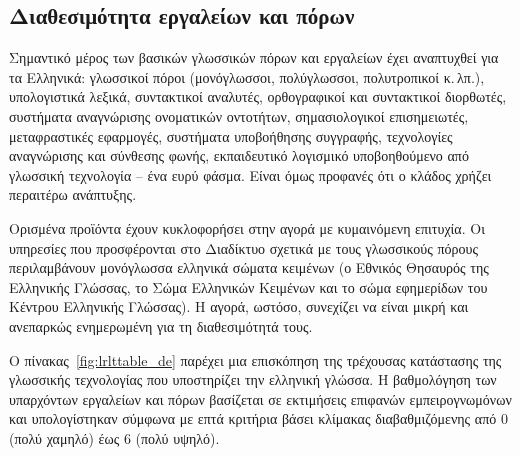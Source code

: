 \begin{multicols}{2}
\subsection{Διαθεσιμότητα εργαλείων και πόρων}

Σημαντικό μέρος των βασικών  γλωσσικών πόρων και εργαλείων έχει αναπτυχθεί για τα Ελληνικά: γλωσσικοί πόροι (μονόγλωσσοι, πολύγλωσσοι, πολυτροπικοί κ.\,λπ.), υπολογιστικά λεξικά, συντακτικοί αναλυτές, ορθογραφικοί και συντακτικοί διορθωτές, συστήματα αναγνώρισης ονοματικών οντοτήτων, σημασιολογικοί επισημειωτές, μεταφραστικές εφαρμογές, συστήματα υποβοήθησης συγγραφής, τεχνολογίες αναγνώρισης και σύνθεσης φωνής, εκπαιδευτικό λογισμικό υποβοηθούμενο από γλωσσική τεχνολογία – ένα ευρύ φάσμα. Είναι όμως προφανές ότι ο κλάδος χρήζει περαιτέρω ανάπτυξης.

Ορισμένα προϊόντα έχουν κυκλοφορήσει στην αγορά με κυμαινόμενη επιτυχία. Οι υπηρεσίες που προσφέρονται στο Διαδίκτυο σχετικά με τους γλωσσικούς πόρους περιλαμβάνουν μονόγλωσσα ελληνικά σώματα κειμένων (ο Εθνικός Θησαυρός της Ελληνικής Γλώσσας, το Σώμα Ελληνικών Κειμένων και το σώμα εφημερίδων του Κέντρου Ελληνικής Γλώσσας). Η αγορά, ωστόσο, συνεχίζει να είναι μικρή και ανεπαρκώς ενημερωμένη για τη διαθεσιμότητά τους.

Ο πίνακας~\ref{fig:lrlttable_de} παρέχει μια επισκόπηση της τρέχουσας κατάστασης της γλωσσικής τεχνολογίας που υποστηρίζει την ελληνική γλώσσα. Η βαθμολόγηση των υπαρχόντων εργαλείων και πόρων βασίζεται σε εκτιμήσεις επιφανών εμπειρογνωμόνων και υπολογίστηκαν σύμφωνα με επτά κριτήρια βάσει κλίμακας διαβαθμιζόμενης από 0 (πολύ χαμηλό) έως 6 (πολύ υψηλό).


\end{multicols}
